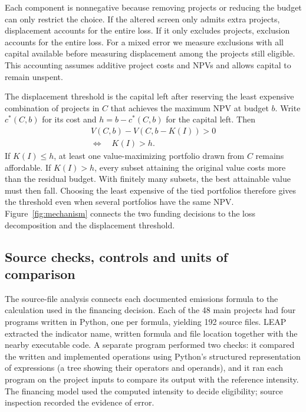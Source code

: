 Each component is nonnegative because removing projects or reducing the budget can only restrict the choice. If the altered screen only admits extra projects, displacement accounts for the entire loss. If it only excludes projects, exclusion accounts for the entire loss. For a mixed error we measure exclusions with all capital available before measuring displacement among the projects still eligible. This accounting assumes additive project costs and NPVs and allows capital to remain unspent.

The displacement threshold is the capital left after reserving the least expensive combination of projects in $C$ that achieves the maximum NPV at budget $b$. Write $c^*(C,b)$ for its cost and $h=b-c^*(C,b)$ for the capital left. Then
\begin{equation}
\begin{gathered}
 V(C,b)-V(C,b-K(I))>0\\
 \Longleftrightarrow\quad K(I)>h .
 \end{gathered}\label{eq:slack}
\end{equation}
If $K(I)\leq h$, at least one value-maximizing portfolio drawn from $C$ remains affordable. If $K(I)>h$, every subset attaining the original value costs more than the residual budget. With finitely many subsets, the best attainable value must then fall. Choosing the least expensive of the tied portfolios therefore gives the threshold even when several portfolios have the same NPV. Figure~\ref{fig:mechanism} connects the two funding decisions to the loss decomposition and the displacement threshold.
\ifdefined\readingcopy\fi

\subsection{Source checks, controls and units of comparison}
The source-file analysis connects each documented emissions formula to the calculation used in the financing decision. Each of the 48 main projects had four programs written in Python, one per formula, yielding 192 source files. LEAP extracted the indicator name, written formula and file location together with the nearby executable code. A separate program performed two checks: it compared the written and implemented operations using Python's structured representation of expressions (a tree showing their operators and operands), and it ran each program on the project inputs to compare its output with the reference intensity. The financing model used the computed intensity to decide eligibility; source inspection recorded the evidence of error.

